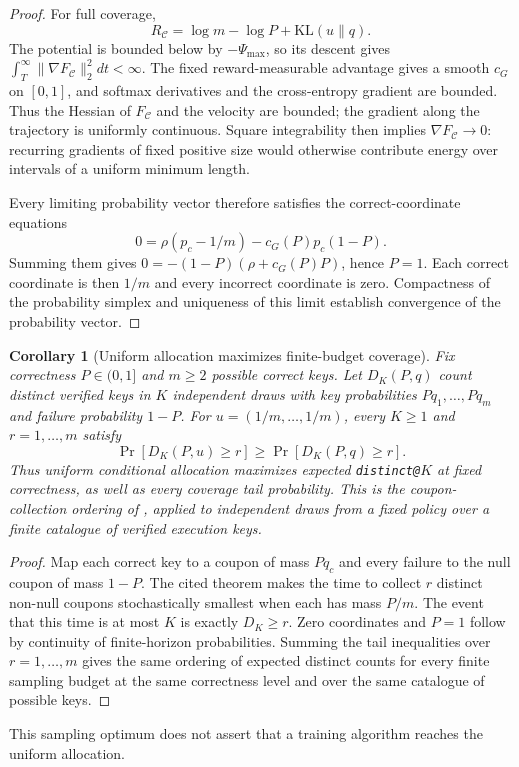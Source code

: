 \documentclass{article}
\newcommand{\enforcehalffinalproseline}{%
  \setlength{\parfillskip}{0pt plus .20\linewidth}}
\newcommand{\1}{\mathbf 1}
\newtheorem{corollary}[lemma]{Corollary}
\theoremstyle{remark}
\theoremstyle{definition}
\theoremstyle{plain}
\begin{document}
\begin{proof}
\enforcehalffinalproseline
For full coverage,
\begin{equation}
 R_{\mathcal C}=\log m-\log P+\mathrm{KL}(u\|q).
 \label{eq:replay-mass-uniformity-decomposition}
\end{equation}
The potential is bounded below by $-\Psi_{\max}$, so its descent gives
$\int_T^\infty\|\nabla F_{\mathcal C}\|_2^2dt<\infty$. The fixed reward-measurable
advantage gives a smooth $c_G$ on $[0,1]$, and softmax derivatives and the cross-entropy
gradient are bounded. Thus the Hessian of $F_{\mathcal C}$ and the velocity
are bounded; the gradient along the trajectory is uniformly continuous.
Square integrability then implies $\nabla F_{\mathcal C}\to0$: recurring
gradients of fixed positive size would otherwise contribute energy over
intervals of a uniform minimum length.

Every limiting probability vector therefore satisfies the correct-coordinate
equations
\[
 0=\rho(p_c-1/m)-c_G(P)p_c(1-P).
\]
Summing them gives $0=-(1-P)(\rho+c_G(P)P)$, hence $P=1$. Each correct
coordinate is then $1/m$ and every incorrect coordinate is zero. Compactness
of the probability simplex and uniqueness of this limit establish convergence
of the probability vector.
\end{proof}

\begin{corollary}[Uniform allocation maximizes finite-budget coverage]
\enforcehalffinalproseline
\label{cor:coupon-uniform-coverage}
Fix correctness $P\in(0,1]$ and $m\ge2$ possible correct keys.
Let $D_K(P,q)$ count distinct verified keys in $K$ independent draws with
key probabilities $Pq_1,\ldots,Pq_m$ and failure probability $1-P$.
For $u=(1/m,\ldots,1/m)$, every $K\ge1$ and $r=1,\ldots,m$ satisfy
\begin{equation}
 \Pr[D_K(P,u)\ge r]\ge\Pr[D_K(P,q)\ge r].
 \label{eq:coupon-uniform-coverage}
\end{equation}
Thus uniform conditional allocation maximizes expected \texttt{distinct@}$K$
at fixed correctness, as well as every coverage tail probability. This is
the coupon-collection ordering of
\citet[Theorem~3, v1]{anceaume2015coupon}, applied to independent draws
from a fixed policy over a finite catalogue of verified execution keys.
\end{corollary}
\begin{proof}
\enforcehalffinalproseline
Map each correct key to a coupon of mass $Pq_c$ and every failure to the
null coupon of mass $1-P$. The cited theorem makes the time to collect $r$
distinct non-null coupons stochastically smallest when each has mass $P/m$.
The event that this time is at most $K$ is exactly $D_K\ge r$.
Zero coordinates and $P=1$ follow by continuity of finite-horizon
probabilities. Summing the tail inequalities over $r=1,\ldots,m$ gives the
same ordering of expected distinct counts for every finite sampling budget
at the same correctness level and over the same catalogue of possible keys.
\end{proof}
This sampling optimum does not assert that a training algorithm reaches the
uniform allocation.
\end{document}
